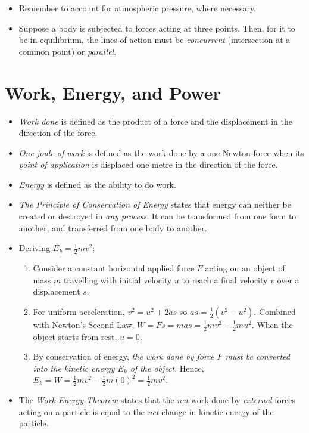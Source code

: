 \documentclass[oneside]{book}
\begin{document}
\begin{itemize}
    \item Remember to account for atmospheric pressure, where necessary.
    \item Suppose a body is subjected to forces acting at three points. Then, for it to be in equilibrium, the lines of action must be \emph{concurrent} (intersection at a common point) or \emph{parallel}. 
\end{itemize}
\chapter{Work, Energy, and Power}
\begin{itemize}
    \item \emph{Work done} is defined as the product of a force and the displacement in the direction of the force.
    \item \emph{One joule of work} is defined as the work done by a one Newton force when its \emph{point of application} is displaced one metre in the direction of the force.
    \item \emph{Energy} is defined as the ability to do work.
    \item \emph{The Principle of Conservation of Energy} states that energy can neither be created or destroyed in \emph{any process}. It can be transformed from one form to another, and transferred from one body to another.
    \item Deriving \(E_k=\frac{1}{2}mv^2\): 
    \begin{enumerate}
        \item Consider a constant horizontal applied force \(F\) acting on an object of mass \(m\) travelling with initial velocity \(u\) to reach a final velocity \(v\) over a displacement \(s\). 
        \item For uniform acceleration, \(v^2=u^2+2as\) so \(as=\frac{1}{2}(v^2-u^2)\). Combined with Newton's Second Law, \(W=Fs=mas=\frac{1}{2}mv^2-\frac{1}{2}mu^2\). When the object starts from rest, \(u=0\). 
        \item By conservation of energy,\emph{ the work done by force \(F\) must be converted into the kinetic energy \(E_k\) of the object}. Hence, \(E_k=W=\frac{1}{2}mv^2-\frac{1}{2}m(0)^2=\frac{1}{2}mv^2\).
    \end{enumerate}
    \item The \emph{Work-Energy Theorem} states that the \emph{net} work done by \emph{external} forces acting on a particle is equal to the \emph{net} change in kinetic energy of the particle.

\end{itemize}
\end{document}

